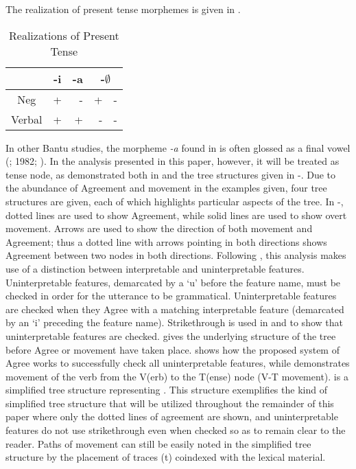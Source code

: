 \documentclass[output=paper]{langsci/langscibook}
\begin{document}
The realization of present tense morphemes is given in .

\begin{table}
\caption{Realizations of Present Tense} %
\centering %
\begin{tabular}{c| r|r|rr} %
\hline %
 &\multicolumn{1}{c}{-i}& \multicolumn{1}{|c|}{-a}& \multicolumn{2}{|c}{-$\emptyset$} \\ [0.5ex] 
\hline %
Neg & + & - & + & -\\ %
Verbal & + & + & -& -\\[1ex] %
\hline %
\end{tabular} 
\label{tab:hresult} 
\end{table} 


In other Bantu studies, the morpheme \textit{-a} found in  is often glossed as a final vowel (\citealt{Khumalo1981}; 1982; \citealt{Sibanda2004}). In the analysis presented in this paper, however, it will be treated as tense node, as demonstrated both in  and the tree structures given in -. Due to the abundance of Agreement and movement in the examples given, four tree structures are given, each of which highlights particular aspects of the tree. In -, dotted lines are used to show Agreement, while solid lines are used to show overt movement. Arrows are used to show the direction of both movement and Agreement; thus a dotted line with arrows pointing in both directions shows Agreement between two nodes in both directions. Following \citet{Chomsky2001}, this analysis makes use of a distinction between interpretable and uninterpretable features. Uninterpretable features, demarcated by a `u' before the feature name, must be checked in order for the utterance to be grammatical. Uninterpretable features are checked when they Agree with a matching interpretable feature (demarcated by an `i' preceding the feature name). Strikethrough is used in  and  to show that uninterpretable features are checked.   gives the underlying structure of the tree before Agree or movement have taken place.  shows how the proposed system of Agree works to successfully check all uninterpretable features, while  demonstrates movement of the verb from the V(erb) to the T(ense) node (V-T movement).  is a simplified tree structure representing . This structure exemplifies the kind of simplified tree structure that will be utilized throughout the remainder of this paper where only the dotted lines of agreement are shown, and uninterpretable features do not use strikethrough even when checked so as to remain clear to the reader. Paths of movement can still be easily noted in the simplified tree structure by the placement of traces (t) coindexed with the lexical material.
\end{document}
